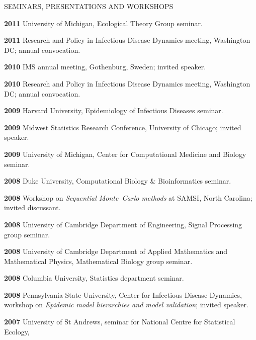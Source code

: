 \begin{mylist}{SEMINARS, PRESENTATIONS AND WORKSHOPS}
\item{\bf 2011 } University of Michigan, Ecological Theory Group seminar.

\item{\bf 2011 } Research and Policy in Infectious Disease Dynamics meeting, Washington DC; annual convocation.

\item{\bf 2010 } IMS annual meeting, Gothenburg, Sweden; invited speaker.

\item{\bf 2010 } Research and Policy in Infectious Disease Dynamics meeting, Washington DC; annual convocation.

\item{\bf 2009 } Harvard University, Epidemiology of Infectious Diseases seminar.

\item{\bf 2009 } Midwest Statistics Research Conference, University of Chicago;  invited speaker.

\item{\bf 2009 } University of Michigan, Center for Computational Medicine and Biology seminar.


\item{\bf 2008 } Duke University, Computational Biology \& Bioinformatics seminar.

\item{\bf 2008 } Workshop on {\it Sequential Monte~Carlo methods} at SAMSI, North Carolina; invited discussant.

\item{\bf 2008 } University of Cambridge Department of Engineering, Signal Processing group seminar.

\item{\bf 2008 } University of Cambridge Department of Applied Mathematics and Mathematical Physics, Mathematical Biology group seminar.

\item{\bf 2008 } Columbia University, Statistics department seminar.

\item{\bf 2008 } Pennsylvania State University, Center for Infectious Disease Dynamics, workshop on {\it Epidemic model hierarchies and model validation}; invited speaker.

\item{\bf 2007 } University of St Andrews, seminar for National Centre for Statistical Ecology, 


\end{mylist}
